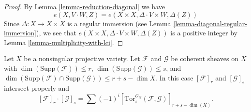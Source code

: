 \begin{proof}
By Lemma \ref{lemma-reduction-diagonal} we have
$$
e(X, V \cdot W, Z) = e(X \times X, \Delta \cdot V \times W, \Delta(Z))
$$
Since $\Delta : X \to X \times X$ is a regular immersion
(see Lemma \ref{lemma-diagonal-regular-immersion}), we see that
$e(X \times X, \Delta \cdot V \times W, \Delta(Z))$ is a positive
integer by Lemma \ref{lemma-multiplicity-with-lci}.
\end{proof}

\begin{lemma}
\label{lemma-tor-sheaf}
\begin{reference}
\cite[Chapter V]{Serre_algebre_locale}
\end{reference}
Let $X$ be a nonsingular projective variety. Let $\mathcal{F}$ and
$\mathcal{G}$ be coherent sheaves on $X$ with
$\dim(\text{Supp}(\mathcal{F})) \leq r$,
$\dim(\text{Supp}(\mathcal{G})) \leq s$, and
$\dim(\text{Supp}(\mathcal{F}) \cap \text{Supp}(\mathcal{G}) )
\leq r + s - \dim X$. In this case $[\mathcal{F}]_r$ and $[\mathcal{G}]_s$
intersect properly and
$$
[\mathcal{F}]_r \cdot [\mathcal{G}]_s = \sum (-1)^i
[\text{Tor}_i^{\mathcal{O}_X}(\mathcal{F}, \mathcal{G})]_{r + s - \dim(X)}.
$$
\end{lemma}

